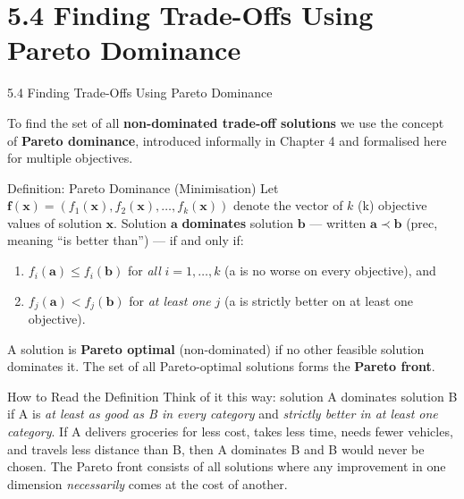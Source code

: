 \documentclass[aspectratio=169,10pt]{beamer}
\begin{document}
\section{5.4 Finding Trade-Offs Using Pareto Dominance}

\begin{frame}[allowframebreaks]{5.4 Finding Trade-Offs Using Pareto Dominance}

  To find the set of all \textbf{non-dominated trade-off solutions} we use the
  concept of \textbf{Pareto dominance}, introduced informally in Chapter 4 and
  formalised here for multiple objectives.

  \begin{block}{Definition: Pareto Dominance (Minimisation)}
    Let $\mathbf{f}(\mathbf{x}) = (f_1(\mathbf{x}), f_2(\mathbf{x}), \ldots,
    f_k(\mathbf{x}))$ denote the vector of $k$ (k) objective values of
    solution $\mathbf{x}$.  Solution $\mathbf{a}$ \textbf{dominates}
    solution $\mathbf{b}$ — written $\mathbf{a} \prec \mathbf{b}$ (prec,
    meaning ``is better than'') — if and only if:
    \begin{enumerate}
      \item $f_i(\mathbf{a}) \leq f_i(\mathbf{b})$ for \emph{all}
            $i = 1, \ldots, k$ (a is no worse on every objective), and
      \item $f_j(\mathbf{a}) < f_j(\mathbf{b})$ for \emph{at least one}
            $j$ (a is strictly better on at least one objective).
    \end{enumerate}
    A solution is \textbf{Pareto optimal} (non-dominated) if no other
    feasible solution dominates it.  The set of all Pareto-optimal
    solutions forms the \textbf{Pareto front}.
  \end{block}

  \begin{alertblock}{How to Read the Definition}
    Think of it this way: solution A dominates solution B if A is
    \emph{at least as good as B in every category} and
    \emph{strictly better in at least one category}.  If A delivers groceries
    for less cost, takes less time, needs fewer vehicles, and travels less
    distance than B, then A dominates B and B would never be chosen.
    The Pareto front consists of all solutions where any improvement in one
    dimension \emph{necessarily} comes at the cost of another.
  \end{alertblock}


\end{frame}
\end{document}
